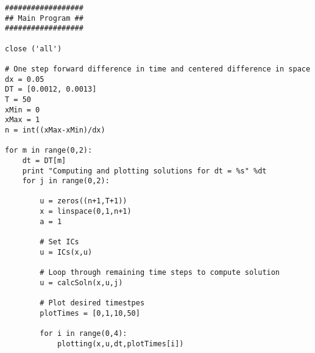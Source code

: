 \documentclass[a4paper,12pt,titlepage]{article}
\begin{document}
\begin{verbatim}
##################
## Main Program ##
##################

close ('all')

# One step forward difference in time and centered difference in space
dx = 0.05
DT = [0.0012, 0.0013]
T = 50
xMin = 0
xMax = 1
n = int((xMax-xMin)/dx)

for m in range(0,2):
    dt = DT[m]
    print "Computing and plotting solutions for dt = %s" %dt
    for j in range(0,2):
        
        u = zeros((n+1,T+1))
        x = linspace(0,1,n+1)
        a = 1
        
        # Set ICs
        u = ICs(x,u)

        # Loop through remaining time steps to compute solution
        u = calcSoln(x,u,j)
        
        # Plot desired timestpes
        plotTimes = [0,1,10,50]
    
        for i in range(0,4):
            plotting(x,u,dt,plotTimes[i])


\end{verbatim}

\end{document}
